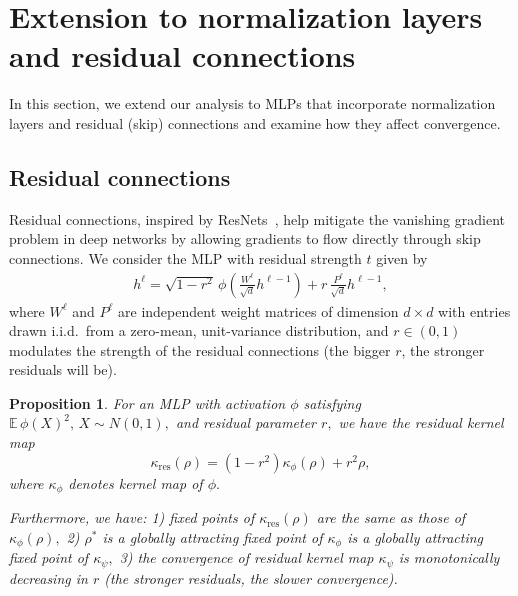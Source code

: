 \documentclass[twoside]{article}
\newcommand{\res}{\text{res}}
\newcommand{\E}{\mathbb{E}\,}
\newtheorem{proposition}{Proposition}
\theoremstyle{definition}
\begin{document}
\section{Extension to normalization layers and residual connections}

In this section, we extend our analysis to MLPs that incorporate normalization layers and residual (skip) connections and examine how they affect convergence.


\subsection{Residual connections}

Residual connections, inspired by ResNets~\citep{he2016deep}, help mitigate the vanishing gradient problem in deep networks by allowing gradients to flow directly through skip connections. We consider the MLP with residual strength $t$ given by
\begin{align*}
h^\ell = \sqrt{1-r^2} \, \phi\left( \frac{W^\ell}{\sqrt{d}}  h^{\ell-1} \right) + r\, \frac{P^\ell}{\sqrt{d}}  h^{\ell-1},
\end{align*}
where $W^\ell$ and $P^\ell$ are independent weight matrices of dimension $d \times d$ with entries drawn i.i.d.~from a zero-mean, unit-variance distribution, and $r \in (0, 1)$ modulates the strength of the residual connections (the bigger $r$, the stronger residuals will be).


\begin{proposition}
\label{prop:residual_kernel_map}
For an MLP with activation $\phi$ satisfying $\E\phi(X)^2,\,X\sim N(0,1),$ and residual parameter $r,$ we have the residual kernel map
\begin{equation}
\kappa_\res(\rho) = (1-r^2) \kappa_\phi(\rho) + r^2 \rho,
\end{equation}
where $\kappa_\phi$ denotes kernel map of $\phi.$

Furthermore, we have: 1) fixed points of $\kappa_\res(\rho)$ are the same as those of $\kappa_\phi(\rho),$ 2)  $\rho^*$ is a globally attracting fixed point of  $\kappa_\phi$ is a globally attracting fixed point of $\kappa_\psi,$ 3) the convergence of residual kernel map $\kappa_\psi$ is monotonically decreasing in $r$ (the stronger residuals, the slower convergence). 
\end{proposition}
\end{document}
